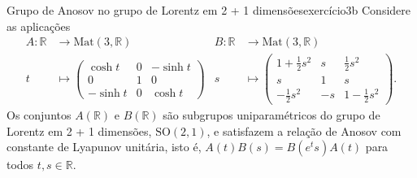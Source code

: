 \begin{example}{Grupo de Anosov no grupo de Lorentz em 2 + 1 dimensões}{exercício3b}
    Considere as aplicações
    \begin{align*}
        A : \mathbb{R} & \to \mathrm{Mat}(3, \mathbb{R})&
        B : \mathbb{R} & \to \mathrm{Mat}(3, \mathbb{R})\\
                     t &\mapsto \begin{pmatrix}
                           \cosh{t} & 0 & -\sinh{t}\\
                           0 & 1 & 0\\
                           -\sinh{t} & 0 & \cosh{t}
                       \end{pmatrix}&
                     s &\mapsto \begin{pmatrix}
                           1 + \frac12 s^2 & s & \frac12s^2\\
                           s & 1 & s\\
                           -\frac12s^2 & -s & 1 - \frac12s^2
                       \end{pmatrix}.
    \end{align*}
    Os conjuntos \(A(\mathbb{R})\) e \(B(\mathbb{R})\) são subgrupos uniparamétricos do grupo de Lorentz em 2 + 1 dimensões, \(\mathrm{SO}(2,1)\), e satisfazem a relação de Anosov com constante de Lyapunov unitária, isto é, \(A(t)B(s) = B(e^ts)A(t)\) para todos \(t,s\in \mathbb{R}\).
\end{example}
